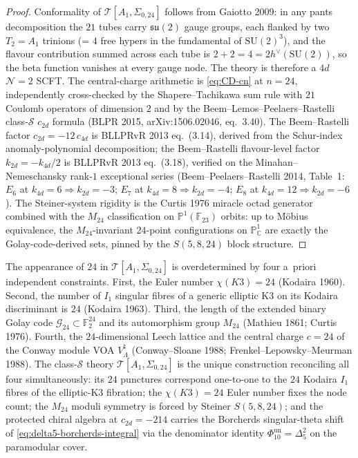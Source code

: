 \begin{proof}
Conformality of $\mathcal{T}[A_1,\Sigma_{0,24}]$ follows from Gaiotto 2009: in
any pants decomposition the $21$ tubes carry $\mathfrak{su}(2)$ gauge groups,
each flanked by two $T_2 = A_1$ trinions (= $4$ free hypers in the fundamental
of $\mathrm{SU}(2)^3$), and the flavour contribution summed across each tube
is $2 + 2 = 4 = 2h^{\vee}(\mathrm{SU}(2))$, so the beta function vanishes at
every gauge node. The theory is therefore a $4d$ $\mathcal{N}=2$ SCFT. The
central-charge arithmetic is \eqref{eq:CD-cn} at $n = 24$, independently
cross-checked by the Shapere--Tachikawa sum rule with $21$ Coulomb operators
of dimension $2$ and by the Beem--Lemos--Peelaers--Rastelli class-$\mathcal{S}$
$c_{2d}$ formula (BLPR 2015, arXiv:1506.02046, eq.~3.40). The Beem--Rastelli
factor $c_{2d} = -12\,c_{4d}$ is BLLPRvR 2013 eq.~(3.14), derived from the
Schur-index anomaly-polynomial decomposition; the Beem--Rastelli flavour-level
factor $k_{2d} = -k_{4d}/2$ is BLLPRvR 2013 eq.~(3.18), verified on the
Minahan--Nemeschansky rank-$1$ exceptional series (Beem--Peelaers--Rastelli
2014, Table~1: $E_6$ at $k_{4d} = 6 \Rightarrow k_{2d} = -3$; $E_7$ at
$k_{4d} = 8 \Rightarrow k_{2d} = -4$; $E_8$ at $k_{4d} = 12 \Rightarrow
k_{2d} = -6$). The Steiner-system rigidity is the Curtis 1976 miracle octad
generator combined with the $M_{24}$ classification on
$\mathbb{P}^1(\mathbb{F}_{23})$ orbits: up to M\"obius equivalence, the
$M_{24}$-invariant $24$-point configurations on $\mathbb{P}^1_{\mathbb{C}}$
are exactly the Golay-code-derived sets, pinned by the $S(5,8,24)$ block
structure.
\end{proof}

\begin{remark}
\label{rem:four-sources-24}
The appearance of $24$ in $\mathcal{T}[A_1,\Sigma_{0,24}]$ is overdetermined
by four a~priori independent constraints. First, the Euler number
$\chi(K3) = 24$ (Kodaira 1960). Second, the number of $I_1$ singular fibres of
a generic elliptic K3 on its Kodaira discriminant is $24$ (Kodaira 1963).
Third, the length of the extended binary Golay code
$\mathcal{G}_{24}\subset \mathbb{F}_2^{24}$ and its automorphism group
$M_{24}$ (Mathieu 1861; Curtis 1976). Fourth, the $24$-dimensional Leech
lattice and the central charge $c = 24$ of the Conway module VOA
$V_\Lambda^\natural$ (Conway--Sloane 1988; Frenkel--Lepowsky--Meurman 1988).
The class-$\mathcal{S}$ theory $\mathcal{T}[A_1,\Sigma_{0,24}]$ is the
unique construction reconciling all four simultaneously: its $24$ punctures
correspond one-to-one to the $24$ Kodaira $I_1$ fibres of the elliptic-K3
fibration; the $\chi(K3) = 24$ Euler number fixes the node count; the $M_{24}$
moduli symmetry is forced by Steiner $S(5,8,24)$; and the protected chiral
algebra at $c_{2d} = -214$ carries the Borcherds singular-theta shift of
\eqref{eq:delta5-borcherds-integral} via the denominator identity
\(\Phi_{10}^{\mathrm{un}}=\Delta_5^2\) on the paramodular cover.
\end{remark}

